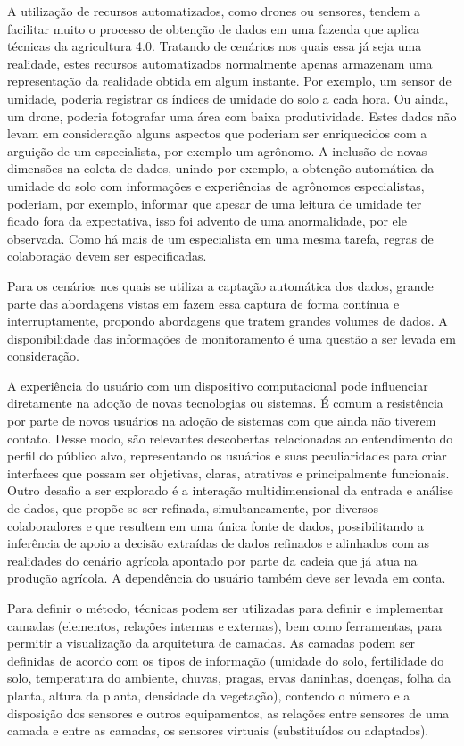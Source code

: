 \documentclass[12pt]{article}
\begin{document}
A utilização de recursos automatizados, como drones ou sensores, tendem a facilitar muito o processo de obtenção de dados em uma fazenda que aplica técnicas da agricultura 4.0. Tratando de cenários nos quais essa já seja uma realidade, estes recursos automatizados normalmente apenas armazenam uma representação da realidade obtida em algum instante. Por exemplo, um sensor de umidade, poderia registrar os índices de umidade do solo a cada hora. Ou ainda, um drone, poderia fotografar uma área com baixa produtividade. Estes dados não levam em consideração alguns aspectos que poderiam ser enriquecidos com a arguição de um especialista, por exemplo um agrônomo. A inclusão de novas dimensões na coleta de dados, unindo por exemplo, a obtenção automática da umidade do solo com informações e experiências de agrônomos especialistas, poderiam, por exemplo, informar que apesar de uma leitura de umidade ter ficado fora da expectativa, isso foi advento de uma anormalidade, por ele observada. Como há mais de um especialista em uma mesma tarefa, regras de colaboração devem ser especificadas.

Para os cenários nos quais se utiliza a captação automática dos dados, grande parte das abordagens vistas em \cite{Massruha:2017} fazem essa captura de forma contínua e interruptamente, propondo abordagens que tratem grandes volumes de dados. A disponibilidade das informações de monitoramento é uma questão a ser levada em consideração.

A experiência do usuário com um dispositivo computacional pode influenciar diretamente na adoção de novas tecnologias ou sistemas. É comum a resistência por parte de novos usuários na adoção de sistemas com que ainda não tiverem contato. Desse modo, são relevantes descobertas relacionadas ao entendimento do perfil do público alvo, representando os usuários e suas peculiaridades para criar interfaces que possam ser objetivas, claras, atrativas e principalmente funcionais. Outro desafio a ser explorado é a interação multidimensional da entrada e análise de dados, que propõe-se ser refinada, simultaneamente, por diversos colaboradores e que resultem em uma única fonte de dados, possibilitando a inferência de apoio a decisão extraídas de dados refinados e alinhados com as realidades do cenário agrícola apontado por parte da cadeia que já atua na produção agrícola. A dependência do usuário também deve ser levada em conta.

Para definir o método, técnicas podem ser utilizadas para definir e implementar camadas (elementos, relações internas e externas), bem como ferramentas, para permitir a visualização da arquitetura de camadas. As camadas podem ser definidas de acordo com os tipos de informação (umidade do solo, fertilidade do solo, temperatura do ambiente, chuvas, pragas, ervas daninhas, doenças, folha da planta, altura da planta, densidade da vegetação), contendo o número e a disposição dos sensores e outros equipamentos, as relações entre sensores de uma camada e entre as camadas, os sensores virtuais (substituídos ou adaptados).
\end{document}
